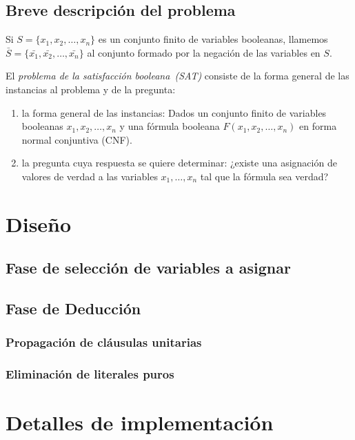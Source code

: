 \documentclass[12pt,lettersize]{article}
\begin{document}
\subsection{Breve descripción del problema} 
Si $S=\{x_1,x_2,\ldots,x_n\}$ es un conjunto finito de variables booleanas,
llamemos $\bar{S}=\{\bar{x_1},\bar{x_2},\ldots,\bar{x_n}\}$ al conjunto formado
por la negación de las variables en $S$. 

El \emph{problema de la satisfacción booleana~(SAT)} consiste de la forma
general de las instancias al problema y de la pregunta:
\vspace{-2.5mm}
\begin{enumerate}
\item la forma general de las instancias: Dados un conjunto finito de variables
  booleanas $x_1,x_2,\ldots,x_n$ y una fórmula booleana $F(x_1,x_2,\ldots,x_n)$
  en forma normal conjuntiva (CNF).
\item la pregunta cuya respuesta se quiere determinar: ¿existe una asignación de
  valores de verdad a las variables $x_1,\ldots, x_n$ tal que la fórmula sea
  verdad?
\end{enumerate}

\section{Diseño}

\subsection{Fase de selección de variables a asignar}

\subsection{Fase de Deducción}

\subsubsection{Propagación de cláusulas unitarias}

\subsubsection{Eliminación de literales puros}


\section{Detalles de implementación}
\end{document}
